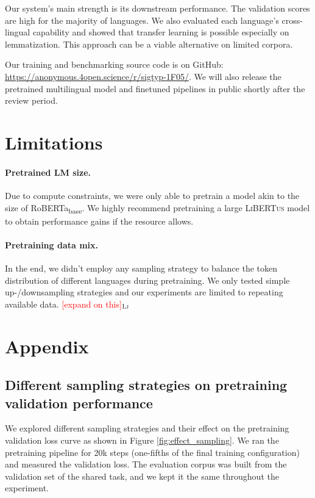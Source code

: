 \documentclass[11pt]{article}
\newcommand{\draftonly}[1]{#1}
\newcommand{\draftcomment}[3]{\draftonly{\textcolor{#2}{[#3]{$_{\textsc{#1}}$}}}}
\newcommand{\lj}[1]{\draftcomment{Lj}{red}{#1}}
\newcommand{\libertus}{\textsc{LiBERTus}}
\newcommand{\githuburl}{\url{https://anonymous.4open.science/r/sigtyp-1F05/}}
\begin{document}
Our system's main strength is its downstream performance.
The validation scores are high for the majority of languages.
We also evaluated each language's cross-lingual capability and showed that transfer learning is possible especially on lemmatization.
This approach can be a viable alternative on limited corpora.

Our training and benchmarking source code is on GitHub: \githuburl{}.
We will also release the pretrained multilingual model and finetuned pipelines in public shortly after the review period.


\section*{Limitations}

\paragraph{Pretrained LM size.}
Due to compute constraints, we were only able to pretrain a model akin to the size of RoBERTa\textsubscript{base}.
We highly recommend pretraining a large \libertus{} model to obtain performance gains if the resource allows.

\paragraph{Pretraining data mix.}
In the end, we didn't employ any sampling strategy to balance the token distribution of different languages during pretraining.
We only tested simple up-/downsampling strategies and our experiments are limited to repeating available data. 
\lj{expand on this}




\appendix

\section{Appendix}
\label{sec:appendix}

\subsection{Different sampling strategies on pretraining validation performance}

We explored different sampling strategies and their effect on the pretraining validation loss curve as shown in Figure \ref{fig:effect_sampling}.
We ran the pretraining pipeline for 20k steps (one-fifths of the final training configuration) and measured the validation loss.
The evaluation corpus was built from the validation set of the shared task, and we kept it the same throughout the experiment.
\end{document}
